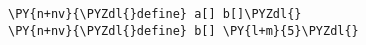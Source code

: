 \begin{Verbatim}[commandchars=\\\{\}]
\PY{n+nv}{\PYZdl{}define} a[] b[]\PYZdl{}
\PY{n+nv}{\PYZdl{}define} b[] \PY{l+m}{5}\PYZdl{}
\end{Verbatim}
